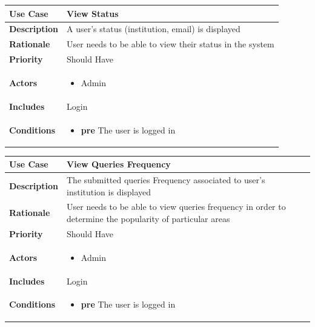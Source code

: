 \vspace{10 mm}


\begin{tabular}{|l|p{8.5cm}|}
\hline \textbf{Use Case} & View Status \\
\hline \textbf{Description} & A user's status (institution, email) is displayed \\
\hline \textbf{Rationale} & User needs to be able to view their status in the system \\
\hline \textbf{Priority} & Should Have \\ 
\hline \textbf{Actors} & 
\begin{itemize}
 \item Admin
\end{itemize} \\
\hline \textbf{Includes} & Login \\
\hline \textbf{Conditions} & 
\begin{itemize}
 \item \textbf{pre} The user is logged in
\end{itemize} \\ \hline
\end{tabular}


\begin{tabular}{|l|p{8.5cm}|}
\hline \textbf{Use Case} & View Queries Frequency \\
\hline \textbf{Description} & The submitted queries Frequency associated to user's institution is displayed \\
\hline \textbf{Rationale} & User needs to be able to view queries frequency in order to determine the popularity of particular areas \\
\hline \textbf{Priority} & Should Have \\ 
\hline \textbf{Actors} & 
\begin{itemize}
 \item Admin
\end{itemize} \\
\hline \textbf{Includes} & Login \\
\hline \textbf{Conditions} & 
\begin{itemize}
 \item \textbf{pre} The user is logged in
\end{itemize} \\ \hline
\end{tabular}

